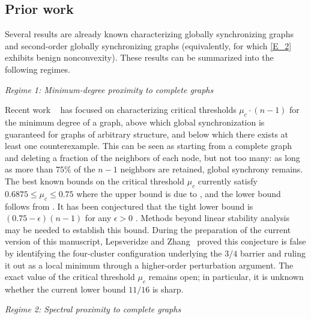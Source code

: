 \documentclass[11pt,reqno]{amsart}
\theoremstyle{definition}
\begin{document}
\subsection{Prior work}
Several results are already known characterizing globally synchronizing graphs and second-order globally synchronizing graphs (equivalently, for which \eqref{E_2} exhibits benign nonconvexity). These results can be summarized into the following regimes.
\newline

\noindent
\textit{Regime 1: Minimum-degree proximity to complete graphs}
\newline

\noindent
Recent work ~\cite{taylor2012there,ling2019landscape,lu2021synchronization,kassabov2021sufficiently,canale2022weighted,yoneda2021lower} has focused on characterizing critical thresholds $\mu_c\cdot (n-1)$ for the minimum degree of a graph, above which global synchronization is guaranteed for graphs of arbitrary structure, and below which there exists at least one counterexample.
This can be seen as starting from a complete graph and deleting a fraction of the neighbors of each node, but not too many: as long as more than $75\%$ of the $n-1$ neighbors are retained, global synchrony remains.
The best known bounds on the critical threshold $\mu_c$ currently satisfy $0.6875\leq \mu_c \leq 0.75$ where the upper bound is due to \cite{kassabov2021sufficiently}, and the lower bound follows from \cite{canale2022weighted}.
It has been conjectured that the tight lower bound is $(0.75-\epsilon)(n-1)$ for any $\epsilon>0$ \cite{bandeira2025randomstrasse101openproblems2024}.
Methods beyond linear stability analysis may be needed to establish this bound.
During the preparation of the current version of this manuscript, Lepsveridze and Zhang~\cite{lepsveridze2026graphs} proved this conjecture is false by identifying the four-cluster configuration underlying the $3/4$ barrier and ruling it out as a local minimum through a higher-order perturbation argument.
The exact value of the critical threshold $\mu_c$ remains open; in particular, it is unknown whether the current lower bound $11/16$ is sharp.
\newline

\noindent
\textit{Regime 2: Spectral proximity to complete graphs}
\newline
\end{document}

